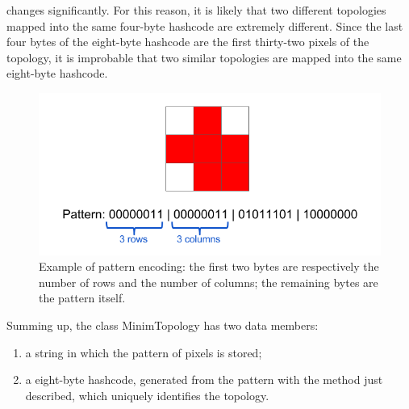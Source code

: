 changes significantly. For this reason, it is likely that two different topologies mapped into the same four-byte hashcode are extremely different. Since the last four bytes of the eight-byte hashcode are the first thirty-two pixels of the topology, it is improbable that two similar topologies are mapped into the same eight-byte hashcode.\\
\begin{figure}
  \centering
  \includegraphics[scale=0.5]{figures/pattern.png}
  \caption{Example of pattern encoding: the first two bytes are respectively the number of rows and the number of columns; the remaining bytes are the pattern itself.}
  \label{fig:pattern}
\end{figure}
%
Summing up, the class MinimTopology has two data members:
\begin{enumerate}
 \item a string in which the pattern of pixels is stored;
 \item a eight-byte hashcode, generated from the pattern with the method just described, which uniquely identifies the topology.
\end{enumerate}
%
